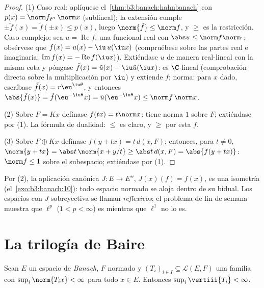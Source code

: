 \begin{proof}
(1) Caso real: aplíquese el~\cref{thm:b3:banach:hahnbanach} con $p(x)
= \norm f_{F'}\,\norm x$ (sublineal); la extensión cumple
$\pm\tilde f(x) = \tilde f(\pm x) \leq p(x)$, luego
$\norm{\tilde f} \leq \norm f$, y $\geq$ es la restricción. Caso
complejo: sea $u = \operatorname{Re}f$, una funcional real con
$\abs u \leq \norm f\norm\cdot$; obsérvese que $f(x) = u(x) -
\iu\,u(\iu x)$ (compruébese sobre las partes real e imaginaria:
$\operatorname{Im}f(x) = -\operatorname{Re}f(\iu x)$). Extiéndase $u$ de
manera real-lineal con la misma cota y póngase $\tilde f(x) =
\tilde u(x) - \iu\tilde u(\iu x)$: es $\C$-lineal (comprobación directa
sobre la multiplicación por $\iu$) y extiende $f$; norma: para $x$ dado,
escríbase $\tilde f(x) = r\eu^{\iu\theta}$, y entonces
$\abs{\tilde f(x)}
= \tilde f(\eu^{-\iu\theta}x) = \tilde u(\eu^{-\iu\theta}x)
\leq \norm f\,\norm x$.

(2) Sobre $F = Kx$ defínase $f(tx) = t\norm x$: tiene norma $1$ sobre
$F$; extiéndase por (1). La fórmula de dualidad: $\leq$ es claro, y
$\geq$ por esta $f$.

(3) Sobre $F \oplus Kx$ defínase $f(y + tx) = t\,d(x, F)$; entonces,
para $t \neq 0$, $\norm{y + tx} = \abs t\,\norm{x + y/t} \geq \abs
t\,d(x, F) = \abs{f(y + tx)}$: $\norm f \leq 1$ sobre el subespacio;
extiéndase por (1).
\end{proof}

\begin{remark}\label{rem:b3:banach:bidual}
Por (2), la aplicación canónica $J \colon E \to E''$, $J(x)(f) =
f(x)$, es una isometría (el~\cref{exo:b3:banach:10}): todo espacio
normado se aloja dentro de su bidual. Los espacios con $J$ sobreyectiva
se llaman \emph{reflexivos}; el problema de fin
de semana muestra que $\ell^p$ ($1 < p < \infty$) es
 mientras que $\ell^1$ no lo es.
\end{remark}

\section{La trilogía de Baire}

\begin{theorem}
\label{thm:b3:banach:banachsteinhaus}
Sean $E$ un espacio de \emph{Banach}, $F$ normado y $(T_i)_{i\in
I} \subseteq \mathcal L(E, F)$ una familia con $\sup_i
\norm{T_ix} < \infty$ para todo $x \in E$. Entonces $\sup_i
\vertiii{T_i} < \infty$.
\end{theorem}

